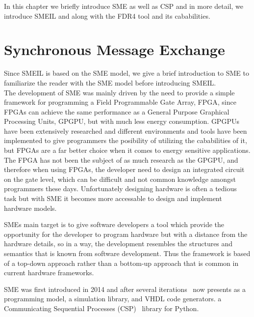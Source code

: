 In this chapter we briefly introduce SME as well as CSP and in more detail, we introduce SMEIL and \cspm{} along with the FDR4 tool and its cababilities.

\section{Synchronous Message Exchange}
Since SMEIL is based on the SME model, we give a brief introduction to SME to familiarize the reader with the SME model before introducing SMEIL.
\\

The development of SME was mainly driven by the need to provide a simple framework for programming a Field Programmable Gate
Array, FPGA, since FPGAs can achieve the same performance as a General Purpose Graphical Processing Units, GPGPU, but with much less energy consumption. GPGPUs have been extensively researched and different environments and tools have been implemented to give programmers the posibility of utilizing the cababilities of it, but FPGAs are a far better choice when it comes to energy sensitive applications. The FPGA has not been the subject of as much research as the GPGPU, and therefore when using FPGAs, the developer need to design an integrated circuit on the gate level, which can be difficult and not common knowledge amongst programmers these days.
Unfortunately designing hardware is often a tedious task but with SME it becomes more accessable to design and implement hardware models.

SMEs main target is to give software developers a tool which provide the opportunity for the developer to program hardware but with a distance from the hardware details, so in a way, the development resembles the structures and semantics that is known from software development.
Thus the framework is based of a top-down approach rather than a bottom-up approach that is common in current hardware frameworks.

SME was first introduced in 2014 and after several iterations~\cite{Vinter2014, Vinter2015, Skovhede} now presents as a programming model, a simulation library, and VHDL code generators. %
a Communicating Sequential Processes (CSP)~\cite{Hoare1978} library for Python.\\

